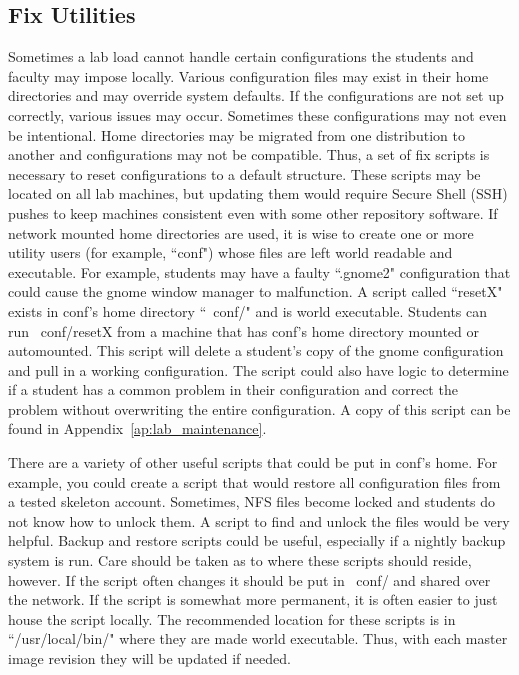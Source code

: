 \subsection{Fix Utilities}

Sometimes a lab load cannot handle certain configurations the students and faculty may impose locally.  Various configuration files may exist in their home directories and may override system defaults.  If the configurations are not set up correctly, various issues may occur.  Sometimes these configurations may not even be intentional.  Home directories may be migrated from one distribution to another and configurations may not be compatible.  Thus, a set of fix scripts is necessary to reset configurations to a default structure.  These scripts may be located on all lab machines, but updating them would require Secure Shell (SSH) pushes to keep machines consistent even with some other repository software.  If network mounted home directories are used, it is wise to create one or more utility users (for example, ``conf") whose files are left world readable and executable.  For example, students may have a faulty ``.gnome2" configuration that could cause the gnome window manager to malfunction.  A script called ``resetX" exists in conf's home directory ``~conf/" and is world executable.  Students can run ~conf/resetX from a machine that has conf's home directory mounted or automounted.  This script will delete a student's copy of the gnome configuration and pull in a working configuration.  The script could also have logic to determine if a student has a common problem in their configuration and correct the problem without overwriting the entire configuration.  A copy of this script can be found in Appendix~\ref{ap:lab_maintenance}. 

There are a variety of other useful scripts that could be put in conf's home.  For example, you could create a script that would restore all configuration files from a tested skeleton account.  Sometimes, NFS files become locked and students do not know how to unlock them.  A script to find and unlock the files would be very helpful.  Backup and restore scripts could be useful, especially if a nightly backup system is run.  Care should be taken as to where these scripts should reside, however.  If the script often changes it should be put in ~conf/ and shared over the network.  If the script is somewhat more permanent, it is often easier to just house the script locally.  The recommended location for these scripts is in ``/usr/local/bin/" where they are made world executable.  Thus, with each master image revision they will be updated if needed.  
